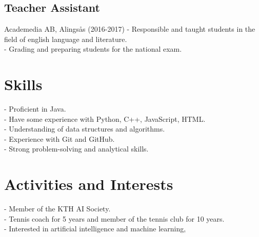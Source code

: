 \documentclass{article}
\begin{document}
\subsection*{Teacher Assistant}
Academedia AB, Alingsås (2016-2017)
- Responsible and taught students in the field of english language and literature. \\
- Grading and preparing students for the national exam. \\

\section*{Skills}
- Proficient in Java. \\
- Have some experience with Python, C++, JavaScript, HTML. \\
- Understanding of data structures and algorithms. \\
- Experience with Git and GitHub. \\
- Strong problem-solving and analytical skills. \\

\section*{Activities and Interests}
- Member of the KTH AI Society. \\
- Tennis coach for 5 years and member of the tennis club for 10 years. \\
- Interested in artificial intelligence and machine learning, \\
\end{document}
